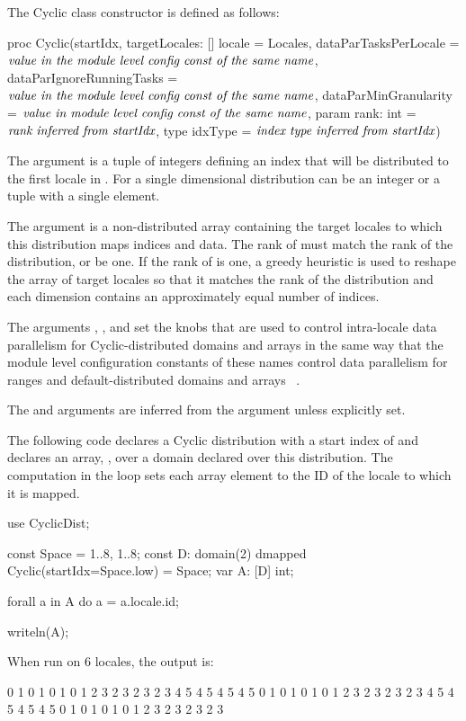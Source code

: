 The Cyclic class constructor is defined as follows:
\begin{chapel}
proc Cyclic(startIdx,
           targetLocales: [] locale = Locales,
           dataParTasksPerLocale = $\mbox{{\it value in the module level config const of the same name}}$,
           dataParIgnoreRunningTasks = $\mbox{{\it value in the module level config const of the same name}}$,
           dataParMinGranularity = $\mbox{{\it value in module level config const of the same name}}$,
           param rank: int = $\mbox{{\it rank inferred from startIdx}}$,
           type idxType = $\mbox{{\it index type inferred from startIdx}}$)
\end{chapel}

The argument  is a tuple of integers defining an index that
will be distributed to the first locale in . For a single
dimensional distribution  can be an integer or a tuple with a
single element.

The argument  is a non-distributed array
containing the target locales to which this distribution maps indices
and data.  The rank of  must match the rank of the
distribution, or be one.  If the rank of
 is one, a greedy heuristic is used to reshape the
array of target locales so that it matches the rank of the
distribution and each dimension contains an approximately equal number
of indices.

The
arguments , ,
and  set the knobs that are used to
control intra-locale data parallelism for Cyclic-distributed domains
and arrays in the same way that the module level configuration constants of
these names control data parallelism for ranges and
default-distributed domains and arrays ~.

The  and  arguments are inferred from the
 argument unless explicitly set.

\begin{example}
The following code declares a Cyclic distribution with a start index
of  and declares an array, , over a domain
declared over this distribution.  The computation in the 
loop sets each array element to the ID of the locale to which it is
mapped.
\begin{chapel}
use CyclicDist;

const Space = {1..8, 1..8};
const D: domain(2) dmapped Cyclic(startIdx=Space.low) = Space;
var A: [D] int;

forall a in A do
  a = a.locale.id;

writeln(A);
\end{chapel}
When run on 6 locales, the output is:
\begin{chapelprintoutput}{}
0 1 0 1 0 1 0 1
2 3 2 3 2 3 2 3
4 5 4 5 4 5 4 5
0 1 0 1 0 1 0 1
2 3 2 3 2 3 2 3
4 5 4 5 4 5 4 5
0 1 0 1 0 1 0 1
2 3 2 3 2 3 2 3
\end{chapelprintoutput}
\end{example}


